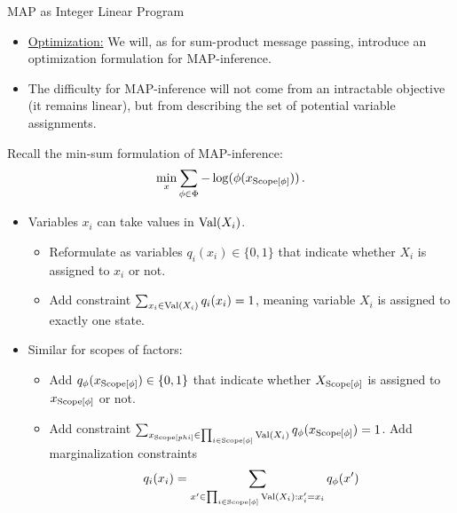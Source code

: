 \begin{frame}{MAP as Integer Linear Program}
\begin{itemize}
    \item \underline{Optimization:} We will, as for sum-product message passing, introduce an optimization formulation for MAP-inference.
    \item The difficulty for MAP-inference will not come from an intractable objective (it remains linear), but from describing the set of potential variable assignments.
\end{itemize}
Recall the min-sum formulation of MAP-inference:
\begin{equation}
    \min_{x} \sum_{\phi \in \Phi} -\log(\phi(x_{\Scope[\phi]}))\,.
\end{equation}
\begin{itemize}
    \pause \item Variables $x_i$ can take values in $\text{Val}(X_i)$.
\begin{itemize}
    \pause \item Reformulate as variables $q_i(x_i) \in \{0,1\}$ that indicate whether $X_i$ is assigned to $x_i$ or not.
    \pause \item Add constraint $\sum_{x_i \in \text{Val}(X_i)} q_i(x_i) = 1$, meaning variable $X_i$ is assigned to exactly one state.
\end{itemize}
\item Similar for scopes of factors:
\begin{itemize}
    \pause \item Add $q_{\phi}(x_{\Scope[\phi]}) \in \{0,1\}$ that indicate whether $X_{\Scope[\phi]}$ is assigned to $x_{\Scope[\phi]}$ or not.
    \pause \item Add constraint $\sum_{x_{\Scope[phi]} \in \prod_{i \in \Scope[\phi]}\Val(X_i)} q_{\phi}(x_{\Scope[\phi]}) = 1$.
    \pause Add marginalization constraints
    \begin{equation}
        q_i(x_i) = \sum_{x' \in \prod_{i \in \Scope[\phi]} \Val(X_i) : x'_i = x_i} q_{\phi}(x')
    \end{equation}
\end{itemize}
\end{itemize}
\end{frame}

